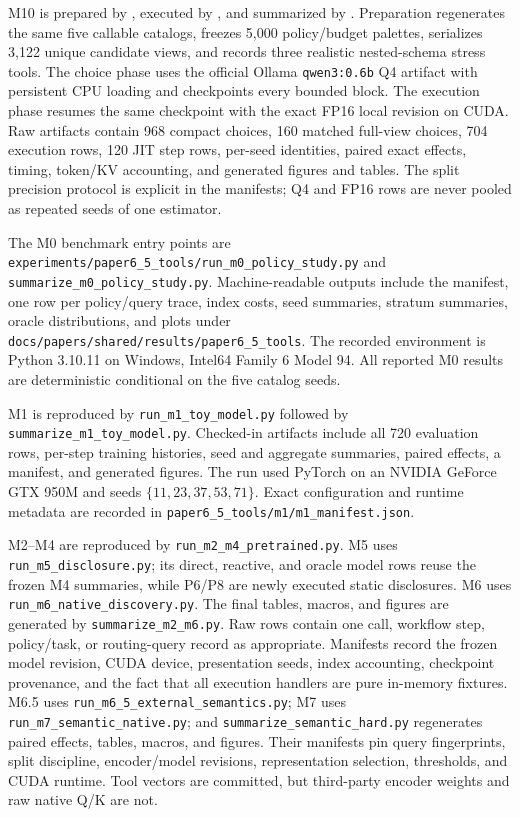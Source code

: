 M10 is prepared by , executed by
, and summarized by
. Preparation regenerates the same five
callable catalogs, freezes 5,000 policy/budget palettes, serializes 3,122 unique
candidate views, and records three realistic nested-schema stress tools. The
choice phase uses the official Ollama \texttt{qwen3:0.6b} Q4 artifact with
persistent CPU loading and checkpoints every bounded block. The execution phase
resumes the same checkpoint with the exact FP16 local revision on CUDA. Raw
artifacts contain 968 compact choices, 160 matched full-view choices, 704
execution rows, 120 JIT step rows, per-seed identities, paired exact effects,
timing, token/KV accounting, and generated figures and tables. The split
precision protocol is explicit in the manifests; Q4 and FP16 rows are never
pooled as repeated seeds of one estimator.

The M0 benchmark entry points are
\texttt{experiments/paper6\_5\_tools/run\_m0\_policy\_study.py} and
\texttt{summarize\_m0\_policy\_study.py}. Machine-readable outputs include the
manifest, one row per policy/query trace, index costs, seed summaries,
stratum summaries, oracle distributions, and plots under
\texttt{docs/papers/shared/results/paper6\_5\_tools}. The recorded environment
is Python 3.10.11 on Windows, Intel64 Family 6 Model 94. All reported M0 results
are deterministic conditional on the five catalog seeds.

M1 is reproduced by \texttt{run\_m1\_toy\_model.py} followed by
\texttt{summarize\_m1\_toy\_model.py}. Checked-in artifacts include all 720
evaluation rows, per-step training histories, seed and aggregate summaries,
paired effects, a manifest, and generated figures. The run used PyTorch on an
NVIDIA GeForce GTX 950M and seeds $\{11,23,37,53,71\}$. Exact configuration and
runtime metadata are recorded in
\texttt{paper6\_5\_tools/m1/m1\_manifest.json}.

M2--M4 are reproduced by \texttt{run\_m2\_m4\_pretrained.py}. M5 uses
\texttt{run\_m5\_disclosure.py}; its direct, reactive, and oracle model rows
reuse the frozen M4 summaries, while P6/P8 are newly executed static
disclosures. M6 uses \texttt{run\_m6\_native\_discovery.py}. The final tables,
macros, and figures are generated by \texttt{summarize\_m2\_m6.py}. Raw rows
contain one call, workflow step, policy/task, or routing-query record as
appropriate. Manifests record the frozen model revision, CUDA device,
presentation seeds, index accounting, checkpoint provenance, and the fact that
all execution handlers are pure in-memory fixtures. M6.5 uses
\texttt{run\_m6\_5\_external\_semantics.py}; M7 uses
\texttt{run\_m7\_semantic\_native.py}; and
\texttt{summarize\_semantic\_hard.py} regenerates paired effects, tables,
macros, and figures. Their manifests pin query fingerprints, split discipline,
encoder/model revisions, representation selection, thresholds, and CUDA
runtime. Tool vectors are committed, but third-party encoder weights and raw
native Q/K are not.

